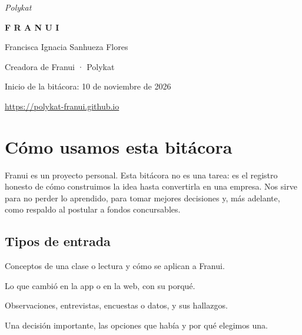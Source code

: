 \documentclass[11pt,a4paper]{article}
\begin{document}
\begin{titlepage}
  \vspace*{4cm}
  {\color{suave}\large\itshape Polykat}\par
  {\fontsize{46}{50}\selectfont\bfseries F R A N U I}\par
  \vspace{2mm}{\color{carmesi}\rule{8cm}{1pt}}\par
  \vspace{6mm}{\Large Bitácora de desarrollo}\par
  \par
  \vfill
  {\large Francisca Ignacia Sanhueza Flores}\par
  {\color{suave} Creadora de Franui · Polykat}\par
  \vspace{4mm}
  {\color{suave} Inicio de la bitácora: 10 de noviembre de 2026}\par
  {\color{suave} \url{https://polykat-franui.github.io}}
\end{titlepage}

\tableofcontents

\clearpage
\section*{Cómo usamos esta bitácora}

Franui es un proyecto personal. Esta bitácora no es una tarea: es el registro honesto de cómo
construimos la idea hasta convertirla en una empresa. Nos sirve para no perder lo aprendido, para
tomar mejores decisiones y, más adelante, como respaldo al postular a fondos concursables.

\subsection*{Tipos de entrada}
\begin{description}[leftmargin=2.6cm,style=nextline]
  \item[Clase] Conceptos de una clase o lectura y cómo se aplican a Franui.
  \item[Avance] Lo que cambió en la app o en la web, con su porqué.
  \item[Evidencia] Observaciones, entrevistas, encuestas o datos, y sus hallazgos.
  \item[Decisión] Una decisión importante, las opciones que había y por qué elegimos una.
\end{description}
\end{document}
